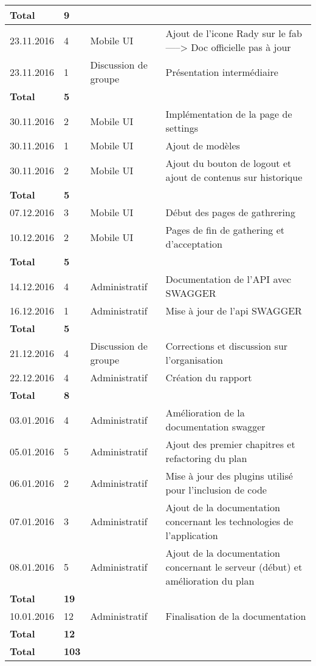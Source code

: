 \documentclass[french]{article}
\begin{document}
\begin{longtable}{p{}|p{}|p{}|p{}}
		\textbf{Total} & \textbf{9} &&\\
		\hline
		23.11.2016 & 4 & Mobile UI & Ajout de l'icone Rady sur le fab -----> Doc officielle pas à jour\\
		23.11.2016 & 1 & Discussion de groupe & Présentation intermédiaire\\
		\textbf{Total} & \textbf{5} &&\\
		\hline
		30.11.2016 & 2 & Mobile UI & Implémentation de la page de settings\\
		30.11.2016 & 1 & Mobile UI & Ajout de modèles\\
		30.11.2016 & 2 & Mobile UI & Ajout du bouton de logout et ajout de contenus sur historique\\
		\textbf{Total} & \textbf{5} &&\\
		\hline
		07.12.2016 & 3 & Mobile UI & Début des pages de gathrering\\
		10.12.2016 & 2 & Mobile UI & Pages de fin de gathering et d'acceptation\\
		\textbf{Total} & \textbf{5} &&\\
		\hline
		14.12.2016 & 4 & Administratif & Documentation de l'API avec SWAGGER\\
		16.12.2016 & 1 & Administratif & Mise à jour de l'api SWAGGER\\
		\textbf{Total} & \textbf{5} &&\\
		\hline
		21.12.2016 & 4 & Discussion de groupe & Corrections et discussion sur l'organisation\\
		22.12.2016 & 4 & Administratif & Création du rapport\\
		\textbf{Total} & \textbf{8} &&\\
		\hline
		03.01.2016 & 4 & Administratif & Amélioration de la documentation swagger\\
		05.01.2016 & 5 & Administratif & Ajout des premier chapitres et refactoring du plan\\
		06.01.2016 & 2 & Administratif & Mise à jour des plugins utilisé pour l'inclusion de code \\
		07.01.2016 & 3 & Administratif & Ajout de la documentation concernant les technologies de l'application\\
		08.01.2016 & 5 & Administratif & Ajout de la documentation concernant le serveur (début) et amélioration du plan\\
		\textbf{Total} & \textbf{19} &&\\
		\hline
		10.01.2016 & 12 & Administratif & Finalisation de la documentation\\
		\textbf{Total} & \textbf{12} &&\\
		\hline\hline
		\textbf{Total} & \textbf{103} &&\\
	\end{longtable}
	
\end{document}
